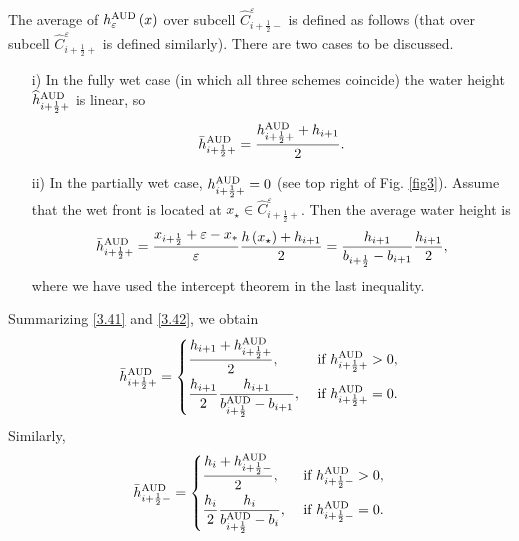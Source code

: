 \documentclass[11pt,a4paper,center,notitlepage]{article}
\numberwithin{equation}{section}
\begin{document}
The average of $h_\varepsilon ^{\rm AUD} \left(x\right)$ over subcell $\widehat C_{i + \frac{1}{2} - }^\varepsilon$ is defined as follows (that over subcell $\widehat C_{i + \frac{1}{2} + }^\varepsilon $ is defined similarly). There are two cases to be discussed.
\begin{itemize}
\item[i)] In the fully wet case (in which all three schemes coincide) the water height $\widehat h_{i + \frac{1}{2} + }^{\rm AUD}$ is linear, so 
\begin{align}
\label{3.41}
\bar h_{i + \frac{1}{2} + }^{\rm AUD} = \frac{{h_{i + \frac{1}{2} + }^{\rm AUD} + {h_{i + 1}}}}{2}.
\end{align}
\item[ii)] In the partially wet case, $h_{i + \frac{1}{2} + }^{\rm AUD} = 0$ (see top right of Fig. \ref{fig3}). Assume that the wet front is located at ${x_\star} \in \widehat C_{i + \frac{1}{2} + }^\varepsilon$. Then the average water height is 
\begin{align}
\label{3.42}
\bar h_{i + \frac{1}{2} + }^{\rm AUD} = \frac{{{x_{i + \frac{1}{2}}} + \varepsilon  - {x_*}}}{\varepsilon }\frac{{h\left( {{x_\star}} \right) + {h_{i + 1}}}}{2} = \frac{{{h_{i + 1}}}}{{{b_{i + \frac{1}{2}}} - {b_{i + 1}}}}\frac{{{h_{i + 1}}}}{2},
\end{align}
where we have used the intercept theorem in the last inequality. 
\end{itemize}
Summarizing \eqref{3.41} and \eqref{3.42}, we obtain
\begin{equation}
\label{3.43}
\bar h_{i + \frac{1}{2} + }^{\rm AUD} = \left\{ \begin{split}
& \frac{{{h_{i + 1}} + h_{i + \frac{1}{2} + }^{\rm AUD}}}{2}, & \mbox{ if }h_{i + \frac{1}{2} + }^{\rm AUD} > 0,\\
& \frac{{{h_{i + 1}}}}{2}\frac{{{h_{i + 1}}}}{{b_{i + \frac{1}{2}}^{\rm AUD} - {b_{i + 1}}}}, & \mbox{ if } h_{i + \frac{1}{2} + }^{\rm AUD} = 0.
\end{split} \right.
\end{equation}
Similarly,
\begin{equation}
\label{3.44}
\bar h_{i + \frac{1}{2} - }^{\rm AUD} = \left\{ \begin{split}
& \frac{{{h_i} + h_{i + \frac{1}{2} - }^{\rm AUD}}}{2}, & \mbox{ if } h_{i + \frac{1}{2} - }^{\rm AUD} > 0,\\
& \frac{{{h_i}}}{2}\frac{{{h_i}}}{{b_{i + \frac{1}{2}}^{\rm AUD} - {b_i}}}, & \mbox{ if } h_{i + \frac{1}{2} - }^{\rm AUD} = 0.
\end{split} \right.
\end{equation}
\end{document}

